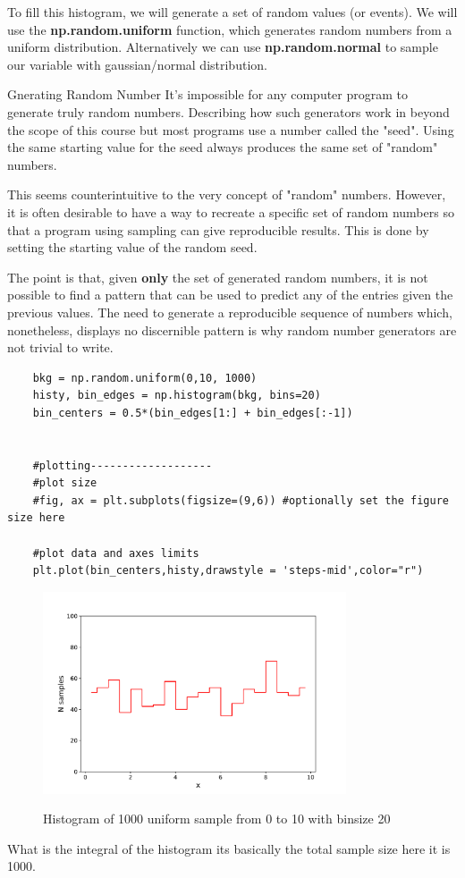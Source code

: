 \documentclass[a4paper,13pt]{report}
\begin{document}
To fill this histogram, we will generate a set of random values (or events). We will use the \textbf{np.random.uniform} function, which generates random numbers from a uniform distribution. Alternatively we can use \textbf{np.random.normal} to sample our variable with gaussian/normal distribution.\\
\begin{note}[label=mylabel]{Gnerating Random Number}
It's impossible for any computer program to generate truly random numbers. Describing how such generators work in beyond the scope of this course but most programs use a number called the "seed". Using the same starting value for the seed always produces the same set of "random" numbers. 

This seems counterintuitive to the very concept of "random" numbers. However, it is often desirable to have a way to recreate a specific set of random numbers so that a program using sampling can give reproducible results. This is done by setting the starting value of the random seed. 

The point is that, given \textbf{only} the set of generated random numbers, it is not possible to find a pattern that can be used to predict any of the entries given the previous values. The need to generate a reproducible sequence of numbers which, nonetheless, displays no discernible pattern is why random number generators are not trivial to write.
\end{note}
\begin{verbatim}
	bkg = np.random.uniform(0,10, 1000) 
	histy, bin_edges = np.histogram(bkg, bins=20)
	bin_centers = 0.5*(bin_edges[1:] + bin_edges[:-1])
	
	
	#plotting-------------------
	#plot size
	#fig, ax = plt.subplots(figsize=(9,6)) #optionally set the figure size here
	
	#plot data and axes limits
	plt.plot(bin_centers,histy,drawstyle = 'steps-mid',color="r")
\end{verbatim}
           \begin{figure}[h!]
           	\centering
           	\includegraphics[width=0.8\textwidth]{../lec1pic1.pdf}
           	\label{l1p1}
           	\caption{Histogram of 1000 uniform sample from 0 to 10 with binsize 20}
           \end{figure} 
 What is the integral of the histogram its basically the total sample size here it is 1000.\\
 
\end{document}
